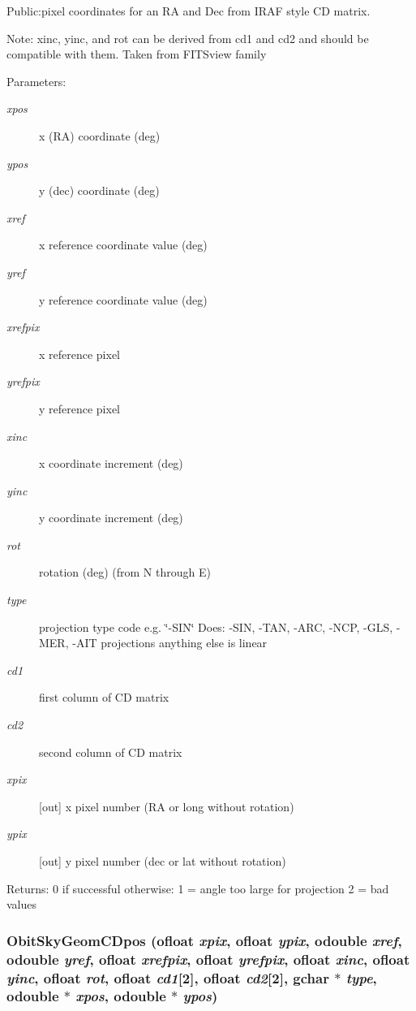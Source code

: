 Public:pixel coordinates for an RA and Dec from IRAF style CD matrix. 

Note: xinc, yinc, and rot can be derived from cd1 and cd2 and should be compatible with them. Taken from FITSview family \begin{Desc}
\item[Parameters:]
\begin{description}
\item[{\em xpos}]x (RA) coordinate (deg) \item[{\em ypos}]y (dec) coordinate (deg) \item[{\em xref}]x reference coordinate value (deg) \item[{\em yref}]y reference coordinate value (deg) \item[{\em xrefpix}]x reference pixel \item[{\em yrefpix}]y reference pixel \item[{\em xinc}]x coordinate increment (deg) \item[{\em yinc}]y coordinate increment (deg) \item[{\em rot}]rotation (deg) (from N through E) \item[{\em type}]projection type code e.g. \char`\"{}-SIN\char`\"{} Does: -SIN, -TAN, -ARC, -NCP, -GLS, -MER, -AIT projections anything else is linear \item[{\em cd1}]first column of CD matrix \item[{\em cd2}]second column of CD matrix \item[{\em xpix}][out] x pixel number (RA or long without rotation) \item[{\em ypix}][out] y pixel number (dec or lat without rotation) \end{description}
\end{Desc}
\begin{Desc}
\item[Returns:]0 if successful otherwise: 1 = angle too large for projection 2 = bad values \end{Desc}
\subsubsection{ Obit\-Sky\-Geom\-CDpos ({\bf ofloat} {\em xpix}, {\bf ofloat} {\em ypix}, {\bf odouble} {\em xref}, {\bf odouble} {\em yref}, {\bf ofloat} {\em xrefpix}, {\bf ofloat} {\em yrefpix}, {\bf ofloat} {\em xinc}, {\bf ofloat} {\em yinc}, {\bf ofloat} {\em rot}, {\bf ofloat} {\em cd1}[2], {\bf ofloat} {\em cd2}[2], gchar $\ast$ {\em type}, {\bf odouble} $\ast$ {\em xpos}, {\bf odouble} $\ast$ {\em ypos})}\label{ObitSkyGeom_8c_a8}


